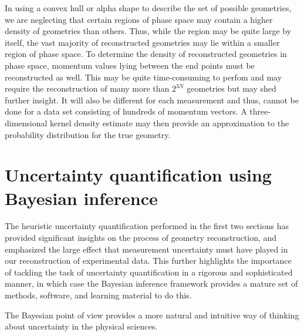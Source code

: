 In using a convex hull or alpha shape to describe the set of possible geometries, we are neglecting that certain regions of phase space may contain a higher density of geometries than others. Thus, while the region may be quite large by itself, the vast majority of reconstructed geometries may lie within a smaller region of phase space. To determine the density of reconstructed geometries in phase space, momentum values lying between the end points must be reconstructed as well. This may be quite time-consuming to perfom and may require the reconstruction of many more than $2^{3N}$ geometries but may shed further insight. It will also be different for each measurement and thus, cannot be done for a data set consisting of hundreds of momentum vectors. A three-dimensional kernel density estimate may then provide an approximation to the probability distribution for the true geometry.


\section{Uncertainty quantification using Bayesian inference} \label{sec:uncertaintyBayesian}
The heuristic uncertainty quantification performed in the first two sections has provided significant insights on the process of geometry reconstruction, and emphasized the large effect that measurement uncertainty must have played in our reconstruction of experimental data. This further highlights the importance of tackling the task of uncertainty quantification in a rigorous and sophisticated manner, in which case the Bayesian inference framework provides a mature set of methods, software, and learning material to do this.

The Bayesian point of view provides a more natural and intuitive way of thinking about uncertainty in the physical sciences.


